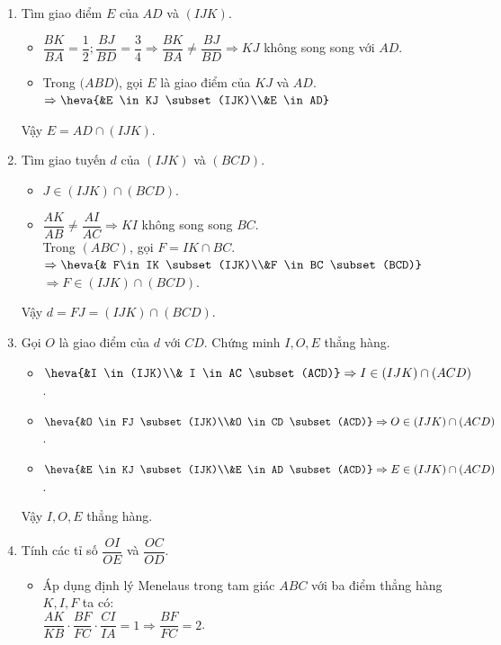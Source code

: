 \begin{bt}
\begin{bt}
{		\begin{enumerate}
			\item Tìm giao điểm $E$ của $AD$ và $(IJK)$.
			\begin{itemize}
				\item $\dfrac{BK}{BA}=\dfrac{1}{2}; \dfrac{BJ}{BD}=\dfrac{3}{4} \Rightarrow \dfrac{BK}{BA}\neq \dfrac{BJ}{BD} \Rightarrow KJ$ không song song với $AD$.
				\item 	Trong $(ABD$), gọi $E$ là giao điểm của $KJ$ và $AD$.\\
				$\Rightarrow \heva{&E \in KJ \subset (IJK)\\&E \in AD}$
			\end{itemize}
			Vậy $E =AD \cap (IJK)$.
			\item Tìm giao tuyến $d$ của $(IJK)$ và $(BCD)$.
			\begin{itemize}
				\item  $ J \in (IJK) \cap (BCD)$.
				\item 	$\dfrac{AK}{AB} \neq \dfrac{AI}{AC} \Rightarrow KI$ không song song $BC$.\\
				Trong $(ABC)$, gọi $F=IK \cap BC$.\\
				$ \Rightarrow \heva{& F\in IK \subset (IJK)\\&F \in BC \subset (BCD)}	$\\
				$\Rightarrow F \in (IJK) \cap (BCD)$.
			\end{itemize}
			Vậy $ d = FJ =(IJK) \cap (BCD)$.
			\item Gọi $O$ là giao điểm của $d$ với $CD$. Chứng minh $I, O, E$ thẳng hàng.
			\begin{itemize}
				\item  $ \heva{&I \in (IJK)\\& I \in AC \subset (ACD)} \Rightarrow I \in (IJK) \cap (ACD)$.
				\item 	$\heva{&O \in FJ \subset (IJK)\\&O \in CD \subset (ACD)} \Rightarrow O \in (IJK) \cap (ACD)$.
				\item $\heva{&E \in KJ \subset (IJK)\\&E \in AD \subset (ACD)} \Rightarrow E \in (IJK) \cap (ACD)$.
			\end{itemize}
			Vậy $I, O, E$ thẳng hàng.
			\item Tính các tỉ số $\dfrac{OI}{OE}$ và $\dfrac{OC}{OD}$.
			\begin{itemize}
				\item Áp dụng định lý Menelaus trong tam giác $ABC$ với ba điểm thẳng hàng $K, I, F$ ta có$\colon$\\ $\dfrac{AK}{KB}\cdot \dfrac{BF}{FC}\cdot \dfrac{CI}{IA}=1 \Rightarrow \dfrac{BF}{FC}=2$.\\

\end{itemize}
\end{enumerate}}
\end{bt}
\end{bt}
